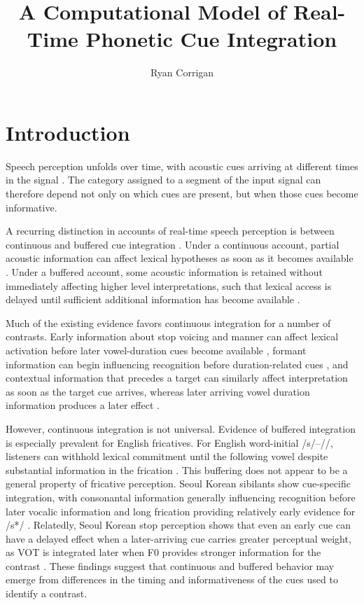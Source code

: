 \documentclass[12pt]{article}
\title{A Computational Model of Real-Time Phonetic Cue Integration}
\author{Ryan Corrigan}
\begin{document}
\maketitle

\section{Introduction}

Speech perception unfolds over time, with acoustic cues arriving at different times in the signal \citep{MillerDexter1988,McMurrayClayardsTanenhausAslin2008,SchreiberMcMurray2019}. 
%
The category assigned to a segment of the input signal can therefore depend not only on which cues are present, but when those cues become informative.

A recurring distinction in accounts of real-time speech perception is between continuous and buffered cue integration \citep{McMurrayClayardsTanenhausAslin2008,GalleEtAl2019,KimTremblayCho2024,MueggeKimMcMurray2026}.
%
Under a continuous account, partial acoustic information can affect lexical hypotheses as soon as it becomes available \citep{McClellandElman1986,AllopennaMagnusonTanenhaus1998,McMurrayClayardsTanenhausAslin2008,ReinischSjerps2013,ToscanoMcMurray2015}.
%
Under a buffered account, some acoustic information is retained without immediately affecting higher level interpretations, such that lexical access is delayed until sufficient additional information has become available \citep{GalleEtAl2019,SchreiberMcMurray2019}.

Much of the existing evidence favors continuous integration for a number of contrasts. 
%
Early information about stop voicing and manner can affect lexical activation before later vowel-duration cues become available \citep{MillerDexter1988,McMurrayClayardsTanenhausAslin2008}, formant information can begin influencing recognition before duration-related cues \citep{ReinischSjerps2013}, and contextual information that precedes a target can similarly affect interpretation as soon as the target cue arrives, whereas later arriving vowel duration information produces a later effect \citep{ToscanoMcMurray2015}.

However, continuous integration is not universal. Evidence of buffered integration is especially prevalent for English fricatives. For English word-initial /s/--/\textesh/, listeners can withhold lexical commitment until the following vowel despite substantial information in the frication \citep{GalleEtAl2019,SchreiberMcMurray2019,KimMueggeMcMurray2026}.
%
This buffering does not appear to be a general property of fricative perception. Seoul Korean sibilants show cue-specific integration, with consonantal information generally influencing recognition before later vocalic information and long frication providing relatively early evidence for /s*/ \citep{Ko2024}.
%
Relatedly, Seoul Korean stop perception shows that even an early cue can have a delayed effect when a later-arriving cue carries greater perceptual weight, as VOT is integrated later when F0 provides stronger information for the contrast \citep{KimTremblayCho2024}.
%
These findings suggest that continuous and buffered behavior may emerge from differences in the timing and informativeness of the cues used to identify a contrast.
\end{document}
